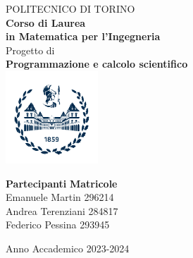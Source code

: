 \documentclass[a4paper,12pt]{report}
\begin{document}

  
\begin{titlepage}

\begin{center}

{\huge POLITECNICO DI TORINO}\\[1.5cm]
\textbf{Corso di Laurea\\in Matematica per l'Ingegneria}\\[3cm]

{\Large Progetto di}\\[1cm]
\textbf{\LARGE Programmazione e calcolo scientifico }\\[2cm]
\includegraphics[width=0.26\textwidth]{polito_logo}
\vspace{4cm}


\begin{minipage}{0.85\textwidth}
\begin{flushleft}\large
\textbf{Partecipanti} \hfill \textbf{Matricole}\\
Emanuele Martin \hfill 296214 \\
Andrea Terenziani \hfill 284817 \\
Federico Pessina \hfill 293945 \\
\end{flushleft}
\end{minipage}

\vfill

Anno Accademico 2023-2024
\end{center}

\restoregeometry %

\end{titlepage}
\end{document}
